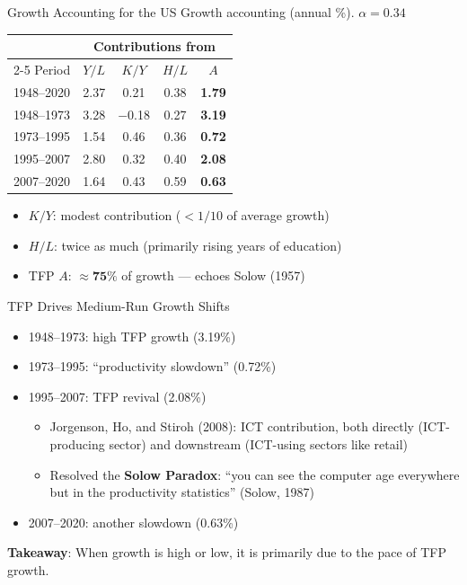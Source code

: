 \documentclass[blue]{beamer}
\begin{document}
\begin{frame}{Growth Accounting for the US}
	Growth accounting (annual \%). $\alpha = 0.34$
	\begin{table}
		\centering
		\small
		\begin{tabular}{lcccc}
			\toprule
			& \multicolumn{4}{c}{Contributions from} \\
			\cmidrule(lr){2-5}
			Period & $Y/L$ & $K/Y$ & $H/L$ & $A$ \\
			\midrule
			1948--2020 & 2.37 & 0.21 & 0.38 & \textbf{1.79} \\
			1948--1973 & 3.28 & $-$0.18 & 0.27 & \textbf{3.19} \\
			1973--1995 & 1.54 & 0.46 & 0.36 & \textbf{0.72} \\
			1995--2007 & 2.80 & 0.32 & 0.40 & \textbf{2.08} \\
			2007--2020 & 1.64 & 0.43 & 0.59 & \textbf{0.63} \\
			\bottomrule
		\end{tabular}
	\end{table}
	
	\begin{itemize}
		\item $K/Y$: modest contribution ($< 1/10$ of average growth)
		\item $H/L$: twice as much (primarily rising years of education)
		\item TFP $A$: $\approx\mathbf{75\%}$ of growth --- echoes Solow (1957)
	\end{itemize}
\end{frame}

\begin{frame}{TFP Drives Medium-Run Growth Shifts}
	\begin{itemize}
		\item 1948--1973: high TFP growth (3.19\%)
		\item 1973--1995: ``productivity slowdown'' (0.72\%)
		\item 1995--2007: TFP revival (2.08\%)
		\begin{itemize}
			\item Jorgenson, Ho, and Stiroh (2008): ICT contribution, both directly (ICT-producing sector) and downstream (ICT-using sectors like retail)
			\item Resolved the \textbf{Solow Paradox}: ``you can see the computer age everywhere but in the productivity statistics'' (Solow, 1987)
		\end{itemize}
		\item 2007--2020: another slowdown (0.63\%)
	\end{itemize}
	
	\bigskip
	\textbf{Takeaway}: When growth is high or low, it is primarily due to the pace of TFP growth.
\end{frame}
\end{document}
